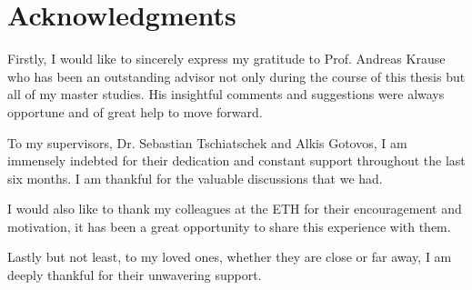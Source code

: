 \chapter*{Acknowledgments}

Firstly, I would like to sincerely express my gratitude to Prof. Andreas Krause who has been an outstanding advisor not only during the course of this thesis but all of my master studies. His insightful comments and suggestions were always opportune and of great help to move forward.

To my supervisors, Dr. Sebastian Tschiatschek and Alkis Gotovos, I am immensely indebted for their dedication and constant support throughout the last six months. I am thankful for the valuable discussions that we had.

I would also like to thank my colleagues at the ETH for their encouragement and motivation, it has been a great opportunity to share this experience with them.

Lastly but not least, to my loved ones, whether they are close or far away, I am deeply thankful for their unwavering support.
